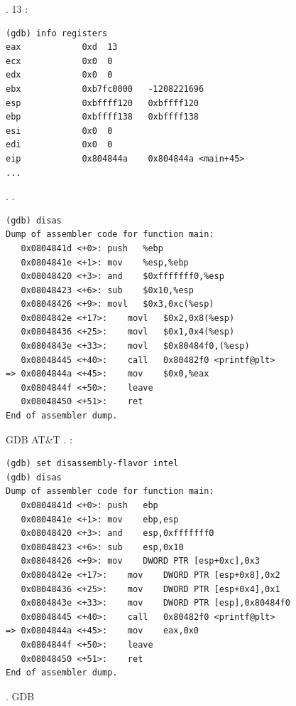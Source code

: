 .
13 \InENRU \EAX:

\begin{lstlisting}
(gdb) info registers
eax            0xd	13
ecx            0x0	0
edx            0x0	0
ebx            0xb7fc0000	-1208221696
esp            0xbffff120	0xbffff120
ebp            0xbffff138	0xbffff138
esi            0x0	0
edi            0x0	0
eip            0x804844a	0x804844a <main+45>
...
\end{lstlisting}

.
.

\begin{lstlisting}
(gdb) disas
Dump of assembler code for function main:
   0x0804841d <+0>:	push   %ebp
   0x0804841e <+1>:	mov    %esp,%ebp
   0x08048420 <+3>:	and    $0xfffffff0,%esp
   0x08048423 <+6>:	sub    $0x10,%esp
   0x08048426 <+9>:	movl   $0x3,0xc(%esp)
   0x0804842e <+17>:	movl   $0x2,0x8(%esp)
   0x08048436 <+25>:	movl   $0x1,0x4(%esp)
   0x0804843e <+33>:	movl   $0x80484f0,(%esp)
   0x08048445 <+40>:	call   0x80482f0 <printf@plt>
=> 0x0804844a <+45>:	mov    $0x0,%eax
   0x0804844f <+50>:	leave  
   0x08048450 <+51>:	ret    
End of assembler dump.
\end{lstlisting}

 \ac{GDB}  AT\&T%
.
:

\begin{lstlisting}
(gdb) set disassembly-flavor intel
(gdb) disas
Dump of assembler code for function main:
   0x0804841d <+0>:	push   ebp
   0x0804841e <+1>:	mov    ebp,esp
   0x08048420 <+3>:	and    esp,0xfffffff0
   0x08048423 <+6>:	sub    esp,0x10
   0x08048426 <+9>:	mov    DWORD PTR [esp+0xc],0x3
   0x0804842e <+17>:	mov    DWORD PTR [esp+0x8],0x2
   0x08048436 <+25>:	mov    DWORD PTR [esp+0x4],0x1
   0x0804843e <+33>:	mov    DWORD PTR [esp],0x80484f0
   0x08048445 <+40>:	call   0x80482f0 <printf@plt>
=> 0x0804844a <+45>:	mov    eax,0x0
   0x0804844f <+50>:	leave  
   0x08048450 <+51>:	ret    
End of assembler dump.
\end{lstlisting}

.
\ac{GDB} 

